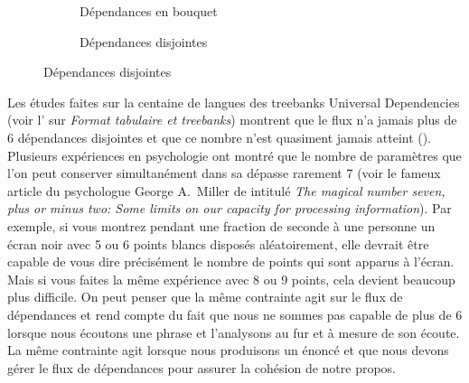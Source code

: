{    \begin{figure}[H]
    \caption{Configurations de dépendances à un point du flux}
    \begin{subfigure}[b]{.5\linewidth}
    \caption{Dépendances en bouquet}
    \end{subfigure}%
    \begin{subfigure}[b]{.5\linewidth}
    \caption{Dépendances disjointes}
    \end{subfigure}
    \end{figure}
 
    Les études faites sur la centaine de langues des treebanks Universal Dependencies (voir l' sur \textit{Format tabulaire et treebanks})
    montrent que le flux n’a jamais plus de 6 dépendances disjointes et que ce nombre n’est quasiment jamais atteint (\cite{kahane2017limitations}).
    Plusieurs expériences en psychologie ont montré que le nombre de paramètres que l’on peut conserver simultanément dans sa  dépasse rarement 7 (voir le fameux article du psychologue George A.\ Miller de \citeyear{miller1956magical} intitulé \textit{The magical number seven, plus or minus two: Some limits on our capacity for processing information}). Par exemple, si vous montrez pendant une fraction de seconde à une personne un écran noir avec 5 ou 6 points blancs disposés aléatoirement, elle devrait être capable de vous dire précisément le nombre de points qui sont apparus à l’écran. Mais si vous faites la même expérience avec 8 ou 9 points, cela devient beaucoup plus difficile. On peut penser que la même contrainte agit sur le flux de dépendances et rend compte du fait que nous ne sommes pas capable de  plus de 6  lorsque nous écoutons une phrase et l’analysons au fur et à mesure de son écoute. La même contrainte agit lorsque nous produisons un énoncé et que nous devons gérer le flux de dépendances pour assurer la cohésion de notre propos.

}
